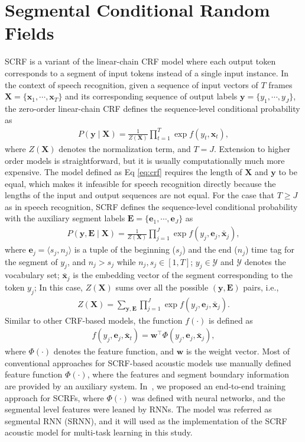 \documentclass[a4paper]{article}
\begin{document}
\section{Segmental Conditional Random Fields}
\label{sec:scrf}

SCRF is a variant of the linear-chain CRF model where each output token corresponds to a segment of input tokens instead of a single input instance. In the context of speech recognition, given a sequence of input vectors of $T$ frames ${\bm X} = \{{\bm x}_1, \cdots, {\bm x}_T\}$ and its corresponding sequence of output labels ${\bm y} = \{y_1, \cdots, y_J\}$, the zero-order linear-chain CRF defines the sequence-level conditional probability as
\begin{align}
\label{eq:crf}
P({\bm y} \mid {\bm X}) = \frac{1}{Z({\bm X})} \prod_{t=1}^T \exp f \left( y_t, {\bm x}_t \right),
\end{align}
where $Z({\bm X})$ denotes the normalization term, and $T=J$. Extension to higher order models is straightforward, but it is usually computationally much more expensive. The model defined as Eq \eqref{eq:crf} requires the length of ${\bm X}$ and ${\bm y}$ to be equal, which makes it infeasible for speech recognition directly because the lengths of the input and output sequences are not equal. For the case that $T\ge J$ as in speech recognition, SCRF defines the sequence-level conditional probability with the auxiliary segment labels ${\bm E} = \{{\bm e}_1, \cdots, {\bm e}_J\}$ as
\begin{align}
\label{eq:scrf}
P({\bm y}, {\bm E} \mid {\bm X}) = \frac{1}{Z({\bm X})} \prod_{j=1}^J \exp f \left( y_j, {\bm e}_j, \bar{\bm x}_j \right),
\end{align}
where $\mathbf{e}_j = \langle s_{j}, n_{j} \rangle$ is a tuple of the beginning ($s_{j}$) and the end ($n_{j}$) time tag for the segment of $y_j$, and $n_j > s_j $ while $n_j, s_j \in [1, T]$; $y_j \in \mathcal{Y}$ and $\mathcal{Y}$ denotes the vocabulary set; $\bar{\bm x}_j$ is the embedding vector of the segment corresponding to the token $y_j$; In this case, $Z({\bm X})$ sums over all the possible $({\bm y, \bm E})$ pairs, i.e.,
\begin{eqnarray}
Z({\bm X}) = \sum_{\bm y,\bm E} \prod_{j=1}^J \exp f \left( y_j, {\bm e}_j, \bar{\bm x}_j \right).
\end{eqnarray}
Similar to other CRF-based models, the function $f(\cdot)$ is defined as
\begin{eqnarray}
\label{eq:phi}
f \left( y_j, {\bm e}_j, \bar{\bm x}_t \right) = \mathbf{w}^\top \Phi (y_j, {\bm e}_j, \bar{\bm x}_j),
\end{eqnarray}
where $\Phi(\cdot)$ denotes the feature function, and $\mathbf{w}$ is the weight vector. Most of conventional approaches for SCRF-based acoustic models use manually defined feature function $\Phi(\cdot)$, where the features and segment boundary information are provided by an auxiliary system. In~\cite{lu2016segmental}, we proposed an end-to-end training approach for SCRFs, where $\Phi(\cdot)$ was defined with neural networks, and the segmental level features were leaned by RNNs. The model was referred as segmental RNN (SRNN), and it will used as the implementation of the SCRF acoustic model for multi-task learning in this study. 
\end{document}
